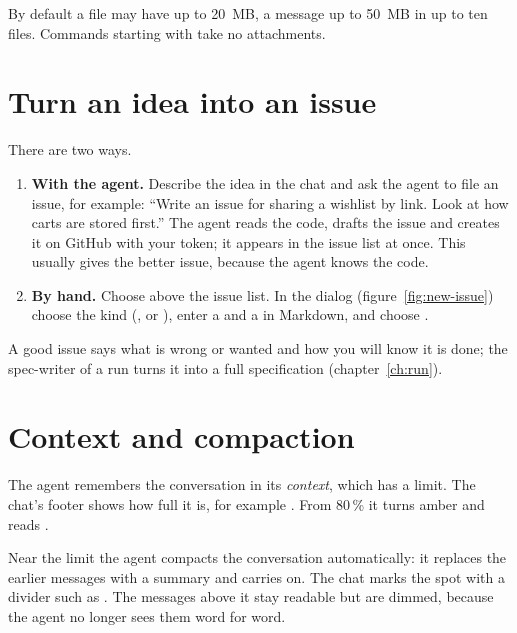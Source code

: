 By default a file may have up to 20~MB, a message up to 50~MB in up to ten files. Commands
starting with  take no attachments.


\section{Turn an idea into an issue}\label{sec:new-issue}

There are two ways.

\begin{enumerate}
  \item \textbf{With the agent.} Describe the idea in the chat and ask the agent to file an issue,
    for example: ``Write an issue for sharing a wishlist by link. Look at how carts are stored
    first.'' The agent reads the code, drafts the issue and creates it on GitHub with your token;
    it appears in the issue list at once. This usually gives the better issue, because the agent
    knows the code.
  \item \textbf{By hand.} Choose  above the issue list. In the dialog
    (figure~\ref{fig:new-issue}) choose the kind (,  or ), enter a
     and a  in Markdown, and choose .
\end{enumerate}

A good issue says what is wrong or wanted and how you will know it is done; the spec-writer of a
run turns it into a full specification (chapter~\ref{ch:run}).


\section{Context and compaction}\label{sec:compaction}

The agent remembers the conversation in its \emph{context}, which has a limit. The chat's footer
shows how full it is, for example . From 80\,\% it turns amber and
reads .

Near the limit the agent compacts the conversation automatically: it replaces the earlier messages
with a summary and carries on. The chat marks the spot with a divider such as
. The messages above it stay readable
but are dimmed, because the agent no longer sees them word for word.

